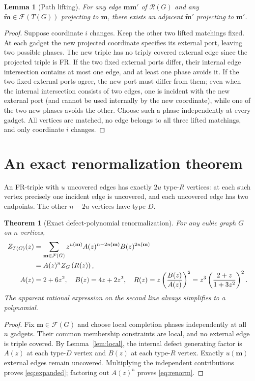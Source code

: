 \documentclass[11pt]{article}
\newtheorem{theorem}{Theorem}
\newtheorem{lemma}{Lemma}
\newcommand{\FR}{\mathcal{F}}
\newcommand{\Rconf}{\mathcal{R}}
\begin{document}
\begin{lemma}[Path lifting]\label{lem:path}
For any edge $\mathbf m\mathbf m'$ of $\Rconf(G)$ and any $\widetilde{\mathbf m}\in\FR(T(G))$ projecting to $\mathbf m$, there exists an adjacent $\widetilde{\mathbf m}'$ projecting to $\mathbf m'$.
\end{lemma}
\begin{proof}
Suppose coordinate $i$ changes. Keep the other two lifted matchings fixed. At each gadget the new projected coordinate specifies its external port, leaving two possible phases. The new triple has no triply covered external edge since the projected triple is FR. If the two fixed external ports differ, their internal edge intersection contains at most one edge, and at least one phase avoids it. If the two fixed external ports agree, the new port must differ from them; even when the internal intersection consists of two edges, one is incident with the new external port (and cannot be used internally by the new coordinate), while one of the two new phases avoids the other. Choose such a phase independently at every gadget. All vertices are matched, no edge belongs to all three lifted matchings, and only coordinate $i$ changes.
\end{proof}

\section{An exact renormalization theorem}
An FR-triple with $u$ uncovered edges has exactly $2u$ type-$R$ vertices: at each such vertex precisely one incident edge is uncovered, and each uncovered edge has two endpoints. The other $n-2u$ vertices have type $D$.

\begin{theorem}[Exact defect-polynomial renormalization]\label{thm:polynomial}
For any cubic graph $G$ on $n$ vertices,
\begin{align}
Z_{T(G)}(z)
 &=\sum_{\mathbf m\in\FR(G)}
  z^{u(\mathbf m)} A(z)^{n-2u(\mathbf m)}B(z)^{2u(\mathbf m)}\label{eq:expanded}\\
 &=A(z)^n Z_G\left(R(z)\right), \label{eq:renorm}\\[-3pt]
A(z)&=2+6z^2,\quad B(z)=4z+2z^2,\quad
R(z)=z\left(\frac{B(z)}{A(z)}\right)^2
 =z^3\left(\frac{2+z}{1+3z^2}\right)^2. \notag
\end{align}
The apparent rational expression on the second line always simplifies to a polynomial.
\end{theorem}
\begin{proof}
Fix $\mathbf m\in\FR(G)$ and choose local completion phases independently at all $n$ gadgets. Their common membership constraints are local, and no external edge is triple covered. By Lemma~\ref{lem:local}, the internal defect generating factor is $A(z)$ at each type-$D$ vertex and $B(z)$ at each type-$R$ vertex. Exactly $u(\mathbf m)$ external edges remain uncovered. Multiplying the independent contributions proves \eqref{eq:expanded}; factoring out $A(z)^n$ proves \eqref{eq:renorm}.
\end{proof}
\end{document}
